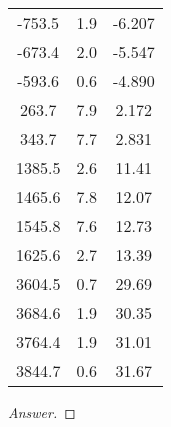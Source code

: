 \documentclass[../psets.tex]{subfiles}
\begin{document}
\begin{enumerate}
\begin{center}
\begin{tabular}{SSS}
            -753.5  & 1.9  & \color{blx}-6.207\\
            -673.4  & 2.0  & \color{blx}-5.547\\
            -593.6  & 0.6  & \color{blx}-4.890\\
            263.7   & 7.9  & \color{blx}2.172\\
            343.7   & 7.7  & \color{blx}2.831\\
            1385.5  & 2.6  & \color{blx}11.41\\
            1465.6  & 7.8  & \color{blx}12.07\\
            1545.8  & 7.6  & \color{blx}12.73\\
            1625.6  & 2.7  & \color{blx}13.39\\
            3604.5  & 0.7  & \color{blx}29.69\\
            3684.6  & 1.9  & \color{blx}30.35\\
            3764.4  & 1.9  & \color{blx}31.01\\
            3844.7  & 0.6  & \color{blx}31.67\\
        \end{tabular}
    \end{center}
    \begin{proof}[Answer]




\end{proof}
\end{enumerate}
\end{document}
